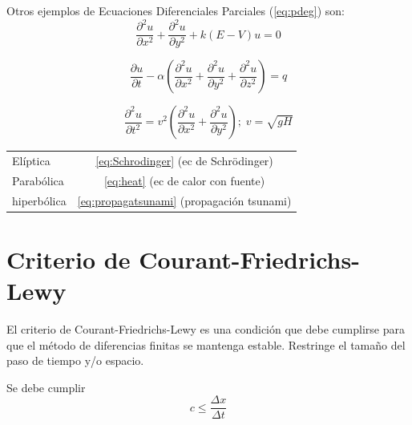 \documentclass{article}
\newcommand\pder[2]{\ensuremath
{\dfrac{\partial#1}{\partial#2}}}
\newcommand{\ppder}[2]{ \ensuremath {\dfrac{\partial^2
#1}{\partial #2^2}}}
\numberwithin{figure}{section}
\numberwithin{equation}{section} %
\begin{document}
 Otros ejemplos de Ecuaciones Diferenciales Parciales (\ref{eq:pdeg}) son:
 \begin{equation}
	\ppder{u}{x} + \ppder{u}{y} + k(E-V)u = 0
	\label{eq:Schrodinger}
\end{equation}

 \begin{equation}
	\pder{u}{t} - \alpha\left( \ppder{u}{x} + \ppder{u}{y} + \ppder{u}{z} \right) = q
	\label{eq:heat}
\end{equation}

 \begin{equation}
	\ppder{u}{t} = v^2 \left( \ppder{u}{x} + \ppder{u}{y} \right); \; v = \sqrt{gH}
	\label{eq:propagatsunami}
\end{equation}

\begin{center}
\begin{tabular}{lc}
\hline
	Elíptica & \autoref{eq:Schrodinger} (ec de Schr\"odinger) \\
	Parabólica & \autoref{eq:heat} (ec de calor con fuente)\\
	hiperbólica & \autoref{eq:propagatsunami} (propagación tsunami)\\
\hline
\end{tabular}
\end{center}

\section{Criterio de Courant-Friedrichs-Lewy}
El criterio de Courant-Friedrichs-Lewy es una condición que debe cumplirse para que el método de diferencias finitas se mantenga estable. Restringe el tamaño del paso de tiempo y/o espacio.

Se debe cumplir
\begin{equation}
	c \leq \frac{\Delta x}{\Delta t}
	\label{eq:Courant}
\end{equation}

\newcommand\derord[3][]{
\def\temp{#1}\ifx\temp\empty
	\ensuremath {\left( \dfrac{\mathrm{d}#2}{\mathrm{d}#3}}
	\right)_j%
\else
	\ensuremath {\left(
	\dfrac{\mathrm{d}^#1#2}{\mathrm{d}#3^#1}} \right)_j%
\fi}
\newcommand\dero[2]{\ensuremath {\left( \dfrac{\mathrm{d}#1}{\mathrm{d}#2}} \right)}
\newcommand\Dt{\ensuremath {\left( \Delta t \right)}}
\newcommand\Dx{\ensuremath {\left( \Delta x \right)}}
\newcommand\dDx{\ensuremath {\left( 2\Delta x \right)}}
\newcommand\dxdero[3]{\ensuremath {\Dt^{\the\numexpr #3 - 1\relax} \derord[#3]{#1}{#2} }}
\end{document}
